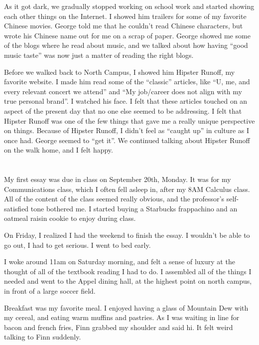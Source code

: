 As it got dark, we gradually stopped working on school work and started showing
each other things on the Internet.  I showed him trailers for some of my
favorite Chinese movies.  George told me that he couldn't read Chinese
characters, but wrote his Chinese name out for me on a scrap of paper.  George
showed me some of the blogs where he read about music, and we talked about how
having ``good music taste'' was now just a matter of reading the right blogs.  

Before we walked back to North Campus, I showed him Hipster Runoff, my favorite
website.  I made him read some of the ``classic'' articles, like ``U, me, and
every relevant concert we attend'' and ``My job/career does not align with my
true personal brand''.  I watched his face.  I felt that these articles touched
on an aspect of the present day that no one else seemed to be addressing.  I
felt that Hipster Runoff was one of the few things that gave me a really unique
perspective on things.  Because of Hipster Runoff, I didn't feel as ``caught
up'' in culture as I once had.   George seemed to ``get it''.   We continued
talking about Hipster Runoff on the walk home, and I felt happy.

\section{}

My first essay was due in class on September 20th, Monday.  It was for my
Communications class, which I often fell asleep in, after my 8AM Calculus class.
All of the content of the class seemed really obvious, and the professor's
self-satisfied tone bothered me.  I started buying a Starbucks frappachino and
an oatmeal raisin cookie to enjoy during class. 

On Friday, I realized I had the weekend to finish the essay.  I wouldn't be
able to go out, I had to get serious. I went to bed early.

I woke around 11am on Saturday morning, and felt a sense of luxury at the
thought of all of the textbook reading I had to do.  I assembled all of the
things I needed and went to the Appel dining hall, at the highest point on north
campus, in front of a large soccer field.

Breakfast was my favorite meal.  I enjoyed having a glass of Mountain Dew with
my cereal, and eating warm muffins and pastries.  As I was waiting in line for
bacon and french fries, Finn grabbed my shoulder and said hi.  It felt weird
talking to Finn suddenly.


